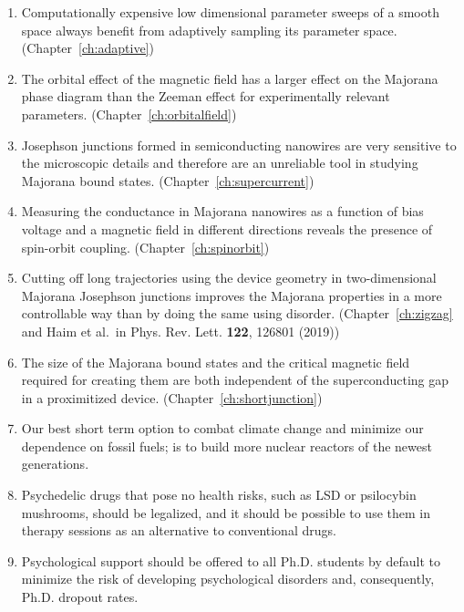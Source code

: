 \documentclass{dissertation}
\begin{document}
\begin{enumerate}
\itemsep-0.08em

\item Computationally expensive low dimensional parameter sweeps of a smooth space always benefit from adaptively sampling its parameter space. (Chapter~\ref{ch:adaptive})

\item The orbital effect of the magnetic field has a larger effect on the Majorana phase diagram than the Zeeman effect for experimentally relevant parameters. (Chapter~\ref{ch:orbitalfield})

\item Josephson junctions formed in semiconducting nanowires are very sensitive to the microscopic details and therefore are an unreliable tool in studying Majorana bound states. (Chapter~\ref{ch:supercurrent})

\item Measuring the conductance in Majorana nanowires as a function of bias voltage and a magnetic field in different directions reveals the presence of spin-orbit coupling. (Chapter~\ref{ch:spinorbit})

\item Cutting off long trajectories using the device geometry in two-dimensional Majorana Josephson junctions improves the Majorana properties in a more controllable way than by doing the same using disorder. (Chapter~\ref{ch:zigzag} and Haim et al.~in Phys. Rev. Lett. \textbf{122}, 126801 (2019))

\item The size of the Majorana bound states and the critical magnetic field required for creating them are both independent of the superconducting gap in a proximitized device. (Chapter~\ref{ch:shortjunction})

\item Our best short term option to combat climate change and minimize our dependence on fossil fuels; is to build more nuclear reactors of the newest generations.

\item Psychedelic drugs that pose no health risks, such as LSD or psilocybin mushrooms, should be legalized, and it should be possible to use them in therapy sessions as an alternative to conventional drugs.

\item Psychological support should be offered to all Ph.D. students by default to minimize the risk of developing psychological disorders and, consequently, Ph.D. dropout rates.


\end{enumerate}
\end{document}
